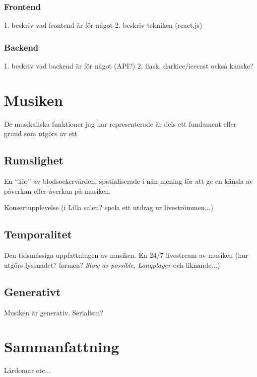 \documentclass[11pt, twoside, a4paper]{article}
\begin{document}
\begin{multicols}{2}
\subsubsection*{Frontend}
1. beskriv vad frontend är för något
2. beskriv tekniken (react.js)

\subsubsection*{Backend}
1. beskriv vad backend är för något (API?)
2. flask, darkice/icecast också kanske? 


\section*{Musiken}


De musikaliska funktioner jag har representerade är dels ett fundament eller grund som utgörs av ett 


\subsection*{Rumslighet}
En \enquote{kör} av blodsockervärden, spatialiserade i nån mening för att ge en känsla av påverkan eller åverkan på musiken. 

Konsertupplevelse (i Lilla salen? spela ett utdrag ur liveströmmen...)

\subsection*{Temporalitet}
Den tidsmässiga uppfattningen av musiken. En 24/7 livestream av musiken (hur utgörs lyssnadet? formen? \emph{Slow as possible}, \emph{Longplayer} och liknande...)

\subsection*{Generativt}
Musiken är generativ. Serialism?

\section*{Sammanfattning}
Lärdomar etc...

\end{multicols}

\twocolumn

\printbibliography[type=book,title={Böcker}]
\printbibliography[type=article,title={Artiklar}]
\end{document}
